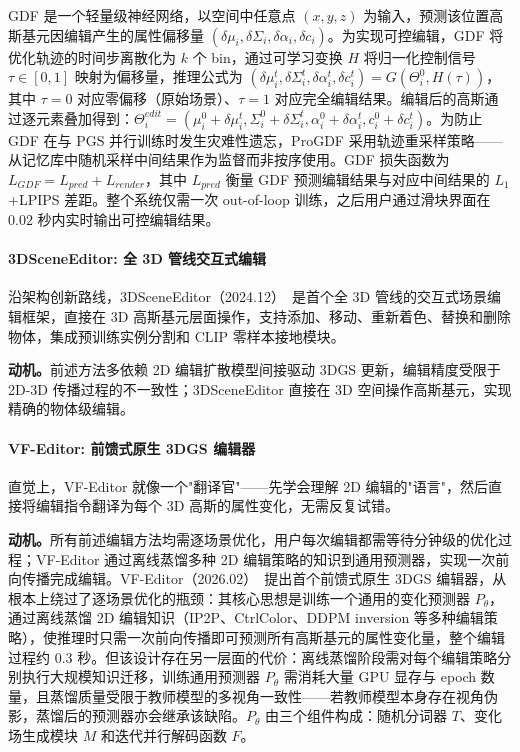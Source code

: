 GDF 是一个轻量级神经网络，以空间中任意点 $(x,y,z)$ 为输入，预测该位置高斯基元因编辑产生的属性偏移量 $(\delta\mu_i, \delta\Sigma_i, \delta\alpha_i, \delta c_i)$。为实现可控编辑，GDF 将优化轨迹的时间步离散化为 $k$ 个 bin，通过可学习变换 $H$ 将归一化控制信号 $\tau \in [0,1]$ 映射为偏移量，推理公式为 $(\delta\mu_i^t, \delta\Sigma_i^t, \delta\alpha_i^t, \delta c_i^t) = G(\Theta_i^0, H(\tau))$，其中 $\tau=0$ 对应零偏移（原始场景）、$\tau=1$ 对应完全编辑结果。编辑后的高斯通过逐元素叠加得到：$\Theta_i^{edit} = (\mu_i^0 + \delta\mu_i^t, \Sigma_i^0 + \delta\Sigma_i^t, \alpha_i^0 + \delta\alpha_i^t, c_i^0 + \delta c_i^t)$。为防止 GDF 在与 PGS 并行训练时发生灾难性遗忘，ProGDF 采用轨迹重采样策略——从记忆库中随机采样中间结果作为监督而非按序使用。GDF 损失函数为 $L_{GDF} = L_{pred} + L_{render}$，其中 $L_{pred}$ 衡量 GDF 预测编辑结果与对应中间结果的 $L_1$+LPIPS 差距。整个系统仅需一次 out-of-loop 训练，之后用户通过滑块界面在 $0.02$ 秒内实时输出可控编辑结果。

\paragraph{3DSceneEditor: 全 3D 管线交互式编辑}

沿架构创新路线，3DSceneEditor（2024.12）~\cite{2412_01583}是首个全 3D 管线的交互式场景编辑框架，直接在 3D 高斯基元层面操作，支持添加、移动、重新着色、替换和删除物体，集成预训练实例分割和 CLIP 零样本接地模块。

\textbf{动机。}前述方法多依赖 2D 编辑扩散模型间接驱动 3DGS 更新，编辑精度受限于 2D-3D 传播过程的不一致性；3DSceneEditor 直接在 3D 空间操作高斯基元，实现精确的物体级编辑。

\paragraph{VF-Editor: 前馈式原生 3DGS 编辑器}

直觉上，VF-Editor 就像一个"翻译官"——先学会理解 2D 编辑的"语言"，然后直接将编辑指令翻译为每个 3D 高斯的属性变化，无需反复试错。

\textbf{动机。}所有前述编辑方法均需逐场景优化，用户每次编辑都需等待分钟级的优化过程；VF-Editor 通过离线蒸馏多种 2D 编辑策略的知识到通用预测器，实现一次前向传播完成编辑。VF-Editor（2026.02）~\cite{2602_11638}提出首个前馈式原生 3DGS 编辑器，从根本上绕过了逐场景优化的瓶颈：其核心思想是训练一个通用的变化预测器 $P_\theta$，通过离线蒸馏 2D 编辑知识（IP2P、CtrlColor、DDPM inversion 等多种编辑策略），使推理时只需一次前向传播即可预测所有高斯基元的属性变化量，整个编辑过程约 $0.3$ 秒。但该设计存在另一层面的代价：离线蒸馏阶段需对每个编辑策略分别执行大规模知识迁移，训练通用预测器 $P_\theta$ 需消耗大量 GPU 显存与 epoch 数量，且蒸馏质量受限于教师模型的多视角一致性——若教师模型本身存在视角伪影，蒸馏后的预测器亦会继承该缺陷。$P_\theta$ 由三个组件构成：随机分词器 $T$、变化场生成模块 $M$ 和迭代并行解码函数 $F$。

